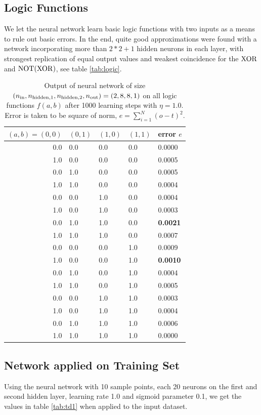 \documentclass[useAMS,usenatbib]{templates/mn2e}
\begin{document}
\subsection{Logic Functions}
We let the neural network learn basic logic functions with two inputs
as a means to rule out basic errors. In the end, quite good
approximations were found with a network incorporating more than
$2*2+1$ hidden neurons in each layer, with strongest replication of
equal output values and weakest coincidence for the $\rm XOR$ and
${\rm NOT}({\rm XOR})$, see table \ref{tab:logic}.
%
\begin{table}\label{tab:logic}
\begin{center}
\begin{tabular}{rllll}\hline\hline
$(a,b)=(0,0)$&$(0,1)$&$(1,0)$&$(1,1)$&error $e$\\
\hline
0.0 & 0.0 & 0.0 & 0.0 & 0.0000\\
1.0 & 0.0 & 0.0 & 0.0 & 0.0005\\
0.0 & 1.0 & 0.0 & 0.0 & 0.0005\\
1.0 & 1.0 & 0.0 & 0.0 & 0.0004\\
0.0 & 0.0 & 1.0 & 0.0 & 0.0004\\
1.0 & 0.0 & 1.0 & 0.0 & 0.0003\\
0.0 & 1.0 & 1.0 & 0.0 & {\bf 0.0021}\\
1.0 & 1.0 & 1.0 & 0.0 & 0.0007\\
0.0 & 0.0 & 0.0 & 1.0 & 0.0009\\
1.0 & 0.0 & 0.0 & 1.0 & {\bf 0.0010}\\
0.0 & 1.0 & 0.0 & 1.0 & 0.0004\\
1.0 & 1.0 & 0.0 & 1.0 & 0.0005\\
0.0 & 0.0 & 1.0 & 1.0 & 0.0003\\
1.0 & 0.0 & 1.0 & 1.0 & 0.0004\\
0.0 & 1.0 & 1.0 & 1.0 & 0.0006\\
1.0 & 1.0 & 1.0 & 1.0 & 0.0000\\
\hline
\end{tabular}
\end{center}

\caption{\label{tab:logical} Output of neural network of size $(n_{\rm in},n_{\rm hidden,1},n_{\rm hidden,2},n_{\rm out})=(2,8,8,1)$ on all logic functions $f(a,b)$ after 1000 learning steps with $\eta=1.0$. Error is taken to be square of norm, $e=\sum_{i=1}^N(o-t)^2$.}
\end{table}
%
\subsection{Network applied on Training Set}
Using the neural network with 10 sample points, each 20 neurons on the
first and second hidden layer, learning rate 1.0 and sigmoid parameter
0.1, we get the values in table \ref{tab:td1} when applied to the
input dataset.
\end{document}
